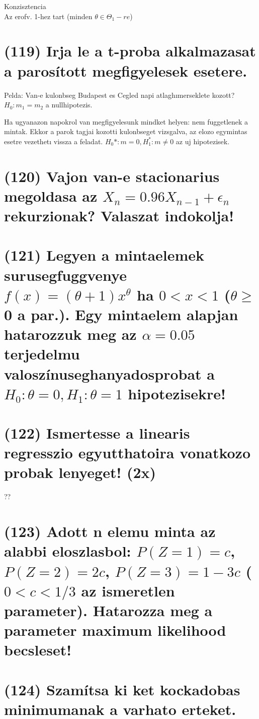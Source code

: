 \documentclass[12p]{article}
\begin{document}
Konzisztencia\\
Az erofv. 1-hez tart (minden $\theta \in \Theta_1-re$)


\section{(119) Irja le a t-proba alkalmazasat a parosított megfigyelesek esetere.}

Pelda: Van-e kulonbseg Budapest es Cegled napi atlaghımerseklete kozott?$H_0: m_1=m_2$ a nullhipotezis. 

Ha ugyanazon napokrol van megfigyelesunk
mindket helyen: nem fuggetlenek a mintak.
Ekkor a parok tagjai kozotti kulonbseget
vizsgalva, az elozo egymintas esetre
vezethetı vissza a feladat. $H_0*: m=0 ,H_1^{*}:m\neq0$ az uj hipotezisek. 


\section{(120) Vajon van-e stacionarius megoldasa az $X_n = 0.96 X_{n-1} + \epsilon_n$ rekurzionak? Valaszat
indokolja!}

\section{(121) Legyen a mintaelemek surusegfuggvenye $f(x) = (\theta + 1)x^{\theta}$ ha $0 < x < 1$ ($\theta \geq$ 0 a par.).
Egy mintaelem alapjan hatarozzuk meg az $\alpha = 0.05$ terjedelmu valoszínuseghanyadosprobat a $H_0 : \theta = 0, H_1 : \theta = 1$ hipotezisekre!}

\section{(122) Ismertesse a linearis regresszio egyutthatoira vonatkozo probak lenyeget! (2x)}

??

\section{(123) Adott n elemu minta az alabbi eloszlasbol: $P(Z = 1) = c$, $P(Z = 2) = 2c$, $P(Z = 3) = 1 - 3c$ ($0 < c < 1/3$ az ismeretlen parameter). Hatarozza meg a parameter maximum likelihood becsleset!}

\section{(124) Szamítsa ki ket kockadobas minimumanak a varhato erteket.}
\end{document}
